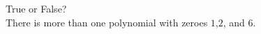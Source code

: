 \documentclass{ximera}
\author{David Kish}
\begin{document}
\begin{exercise}
True or False?\\
There is more than one polynomial with zeroes $1$,$2$, and $6$.
\begin{multipleChoice}
\end{multipleChoice}


\end{exercise}
\end{document}
